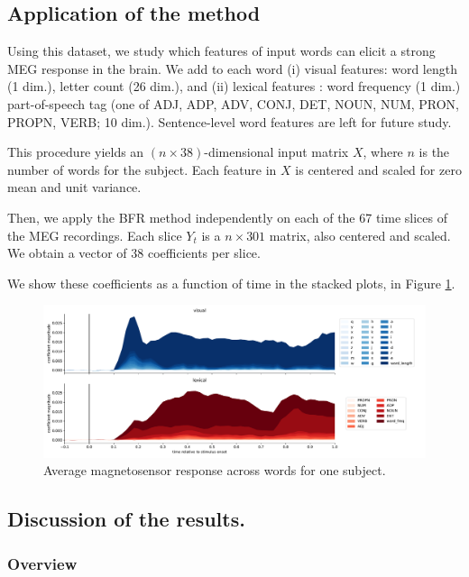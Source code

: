 \subsection{Application of the method}

Using this dataset, we study which features of input words can elicit a strong
MEG response in the brain.  We add to each word (i) visual features: word length
(1 dim.), letter count (26 dim.), and (ii) lexical features : word frequency (1
dim.) part-of-speech tag (one of ADJ, ADP, ADV, CONJ, DET, NOUN, NUM, PRON,
PROPN, VERB; 10 dim.). Sentence-level word features are left for future study.

This procedure yields an $\left(n \times 38\right)$-dimensional input matrix $X$,
where $n$ is the number of words for the subject. Each feature in $X$ is centered and
scaled for zero mean and unit variance.

Then, we apply the BFR method independently on each of the 67 time slices of the
MEG recordings. Each slice $Y_t$ is a $n \times 301$ matrix, also centered and
scaled. We obtain a vector of 38 coefficients per slice.

We show these coefficients as a function of time in the stacked plots, in Figure
\ref{fig:megresult}.

\begin{figure}
  \centering
  \includegraphics[width=\textwidth, trim=1.5cm 1cm 0.5cm 0cm,
clip=True]{meg_result.pdf}
  \caption{Average magnetosensor response across words for one subject.}
  \label{fig:megresult}
\end{figure}


\subsection{Discussion of the results.}

\subsubsection{Overview}


